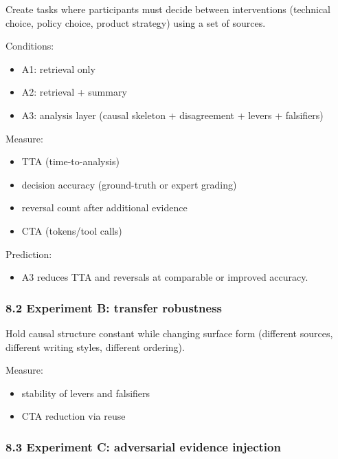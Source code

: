 \documentclass[11pt]{article}
\providecommand{\tightlist}{%
  \setlength{\itemsep}{0pt}\setlength{\parskip}{0pt}}
\begin{document}
Create tasks where participants must decide between interventions
(technical choice, policy choice, product strategy) using a set of
sources.

Conditions:

\begin{itemize}
\tightlist
\item
  A1: retrieval only
\item
  A2: retrieval + summary
\item
  A3: analysis layer (causal skeleton + disagreement + levers +
  falsifiers)
\end{itemize}

Measure:

\begin{itemize}
\tightlist
\item
  TTA (time-to-analysis)
\item
  decision accuracy (ground-truth or expert grading)
\item
  reversal count after additional evidence
\item
  CTA (tokens/tool calls)
\end{itemize}

Prediction:

\begin{itemize}
\tightlist
\item
  A3 reduces TTA and reversals at comparable or improved accuracy.
\end{itemize}

\hypertarget{experiment-b-transfer-robustness}{%
\subsubsection{8.2 Experiment B: transfer
robustness}\label{experiment-b-transfer-robustness}}

Hold causal structure constant while changing surface form (different
sources, different writing styles, different ordering).

Measure:

\begin{itemize}
\tightlist
\item
  stability of levers and falsifiers
\item
  CTA reduction via reuse
\end{itemize}

\hypertarget{experiment-c-adversarial-evidence-injection}{%
\subsubsection{8.3 Experiment C: adversarial evidence
injection}\label{experiment-c-adversarial-evidence-injection}}
\end{document}

